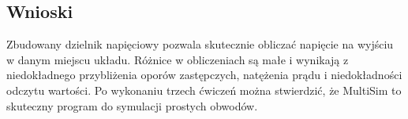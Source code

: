 \documentclass[11pt]{article}
\begin{document}
\subsection{Wnioski}
Zbudowany dzielnik napięciowy pozwala skutecznie obliczać napięcie na wyjściu w danym miejscu układu. Różnice w obliczeniach są małe i wynikają z niedokładnego przybliżenia oporów zastępczych, natężenia prądu i niedokładności odczytu wartości.
Po wykonaniu trzech ćwiczeń można stwierdzić, że MultiSim to skuteczny program do symulacji prostych obwodów.
\end{document}

